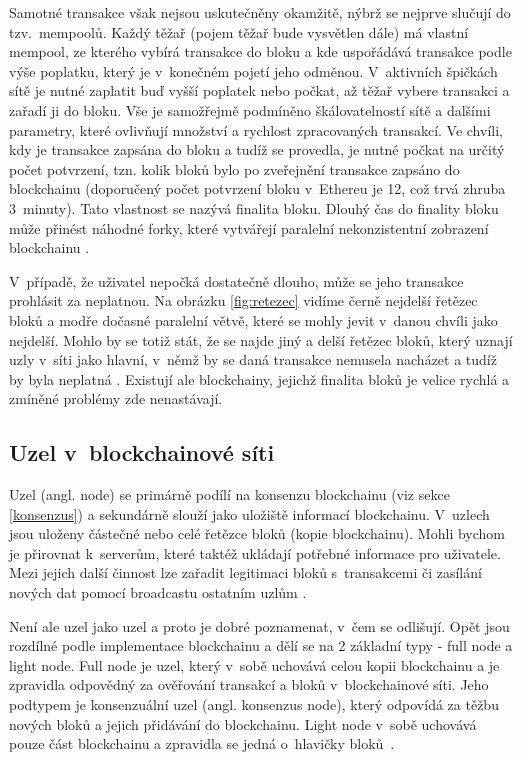 Samotné transakce však nejsou uskutečněny okamžitě, nýbrž se nejprve slučují do tzv.~mempoolů. Každý těžař (pojem těžař bude vysvětlen dále) má vlastní mempool, ze kterého vybírá transakce do bloku a kde uspořádává transakce podle výše poplatku, který je v~konečném pojetí jeho odměnou. V~aktivních špičkách sítě je nutné zaplatit buď vyšší poplatek nebo počkat, až těžař vybere transakci a zařadí ji do bloku. Vše je samožřejmě podmíněno škálovatelností sítě a dalšími parametry, které ovlivňují množství a rychlost zpracovaných transakcí. Ve chvíli, kdy je transakce zapsána do bloku a tudíž se provedla, je nutné počkat na určitý počet potvrzení, tzn. kolik bloků bylo po zveřejnění transakce zapsáno do blockchainu (doporučený počet potvrzení bloku v~Ethereu je 12, což trvá zhruba 3~minuty). Tato vlastnost se nazývá finalita bloku. Dlouhý čas do finality bloku může přinést náhodné forky, které vytvářejí paralelní nekonzistentní zobrazení blockchainu \cite{transaction}. 

V~případě, že uživatel nepočká dostatečně dlouho, může se jeho transakce prohlásit za neplatnou. Na obrázku \ref{fig:retezec} vidíme černě nejdelší řetězec bloků a modře dočasné paralelní větvě, které se mohly jevit v~danou chvíli jako nejdelší. Mohlo by se totiž stát, že se najde jiný a delší řetězec bloků, který uznají uzly v~síti jako hlavní, v~němž by se daná transakce nemusela nacházet a tudíž by byla neplatná \cite{Transaction_confirmations}. Existují ale blockchainy, jejichž finalita bloků je velice rychlá a zmíněné problémy zde nenastávají.  
\subsection*{Uzel v~blockchainové síti}
Uzel (angl. node) se primárně podílí na konsenzu blockchainu (viz sekce \ref{konsenzus}) a sekundárně slouží jako uložiště informací blockchainu. V~uzlech jsou uloženy částečné nebo celé řetězce bloků (kopie blockchainu). Mohli bychom je přirovnat k~serverům, které taktéž ukládají potřebné informace pro uživatele. Mezi jejich další činnost lze zařadit legitimaci bloků s~transakcemi či zasílání nových dat pomocí broadcastu ostatním uzlům \cite{Abrol2022}. 

Není ale uzel jako uzel a proto je dobré poznamenat, v~čem se odlišují. Opět jsou rozdílné podle implementace blockchainu a dělí se na 2 základní typy - full node a light node. Full node je uzel, který v~sobě uchovává celou kopii blockchainu a je zpravidla odpovědný za ověřování transakcí a bloků v~blockchainové síti. Jeho podtypem je konsenzuální uzel (angl. konsenzus node), který odpovídá za těžbu nových bloků a jejich přidávání do blockchainu. Light node v~sobě uchovává pouze část blockchainu a zpravidla se jedná o~hlavičky bloků~\cite{Node2018}.

